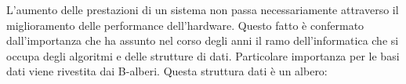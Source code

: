 

\begin{flushleft}
	L'aumento delle prestazioni di un sistema non passa necessariamente attraverso il miglioramento delle performance dell'hardware. Questo fatto è confermato dall'importanza che ha assunto nel corso degli anni il ramo dell'informatica che si occupa degli algoritmi e delle strutture di dati. Particolare importanza per le basi dati viene rivestita dai B-alberi.
	Questa struttura dati è un albero:
	\newline
	
	
	
\end{flushleft}

